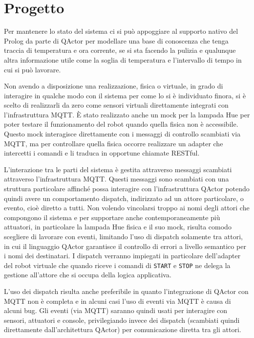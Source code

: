 \section{Progetto}
Per mantenere lo stato del sistema ci si può appoggiare al supporto nativo del Prolog da parte di QActor per modellare una base di conoscenza che tenga traccia di temperatura e ora corrente, se si sta facendo la pulizia e qualunque altra informazione utile come la soglia di temperatura e l'intervallo di tempo in cui si può lavorare.

Non avendo a disposizione una realizzazione, fisica o virtuale, in grado di interagire in qualche modo con il sistema per come lo si è individuato finora, si è scelto di realizzarli da zero come sensori virtuali direttamente integrati con l'infrastruttura MQTT. È stato realizzato anche un mock per la lampada Hue per poter testare il funzionamento del robot quando quella fisica non è accessibile. Questo mock interagisce direttamente con i messaggi di controllo scambiati via MQTT, ma per controllare quella fisica occorre realizzare un adapter che intercetti i comandi e li traduca in opportune chiamate RESTful.

L'interazione tra le parti del sistema è gestita attraverso messaggi scambiati attraverso l'infrastruttura MQTT. Questi messaggi sono scambiati con una struttura particolare affinché possa interagire con l'infrastruttura QActor potendo quindi avere un comportamento dispatch, indirizzato ad un attore particolare, o evento, cioè diretto a tutti. Non volendo vincolarsi troppo ai nomi degli attori che compongono il sistema e per supportare anche contemporaneamente più attuatori, in particolare la lampada Hue fisica e il suo mock, risulta comodo scegliere di lavorare con eventi, limitando l'uso di dispatch solamente tra attori, in cui il linguaggio QActor garantisce il controllo di errori a livello semantico per i nomi dei destinatari. I dispatch verranno impiegati in particolare dell'adapter del robot virtuale che quando riceve i comandi di \texttt{START} e \texttt{STOP} ne delega la gestione all'attore che si occupa della logica applicativa.

L'uso dei dispatch risulta anche preferibile in quanto l'integrazione di QActor con MQTT non è completa e in alcuni casi l'uso di eventi via MQTT è causa di alcuni bug. Gli eventi (via MQTT) saranno quindi usati per interagire con sensori, attuatori e console, privilegiando invece dei dispatch (scambiati quindi direttamente dall'architettura QActor) per comunicazione diretta tra gli attori.

